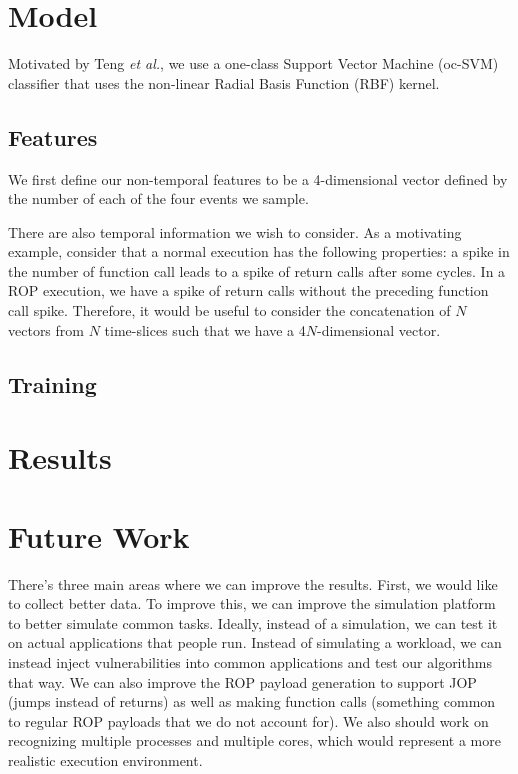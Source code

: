 \documentclass[letterpaper,twocolumn,10pt]{article}
\begin{document}
\section{Model}

Motivated by Teng \textit{et al.}, we use a one-class Support Vector Machine (oc-SVM) 
classifier that uses the non-linear Radial Basis Function (RBF) kernel\cite{DBLP:journals/corr/TangSS14}.

\subsection*{Features}

We first define our non-temporal features to be a 4-dimensional vector defined 
by the number of each of the four events we sample.

There are also temporal information we wish to consider. As a motivating example, 
consider that a normal execution has the following properties: a spike in the number 
of function call leads to a spike of return calls after some cycles. In a ROP execution, 
we have a spike of return calls without the preceding function call spike. Therefore, 
it would be useful to consider the concatenation of $N$ vectors from $N$ time-slices 
such that we have a 4$N$-dimensional vector.

\subsection*{Training}

\section{Results}

\section{Future Work}

There's three main areas where we can improve the results. First, we would like to collect better data. To improve this, we can improve the simulation platform to better simulate common tasks. Ideally, instead of a simulation, we can test it on actual applications that people run. Instead of simulating a workload, we can instead inject vulnerabilities into common applications and test our algorithms that way. We can also improve the ROP payload generation to support JOP (jumps instead of returns) as well as making function calls (something common to regular ROP payloads that we do not account for). We also should work on recognizing multiple processes and multiple cores, which would represent a more realistic execution environment.
\end{document}
